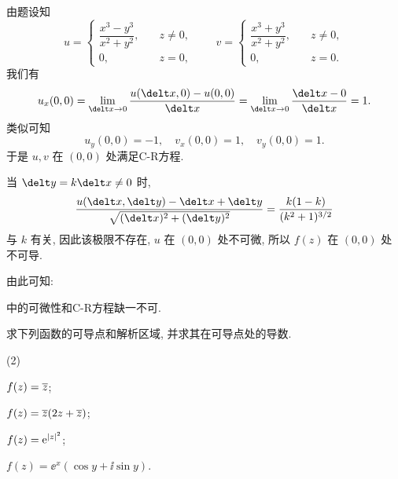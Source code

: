 \begin{solution}
  由题设知
  \[
    u=\begin{cases}
        \dfrac{x^3-y^3}{x^2+y^2},\quad &z\neq 0,\\
        0,&z=0,
      \end{cases}\qquad
    v=\begin{cases}
        \dfrac{x^3+y^3}{x^2+y^2},\quad &z\neq 0,\\
        0,&z=0.
      \end{cases}
  \]
  我们有
  \[
     u_x(0,0)
    =\lim_{\delt x\ra 0}\frac{u(\delt x,0)-u(0,0)}{\delt x}
    =\lim_{\delt x\ra 0}\frac{\delt x-0}{\delt x}=1.
  \]
  类似可知
  \[
    u_y(0,0)=-1,\quad
    v_x(0,0)=1,\quad
    v_y(0,0)=1.
  \]
  于是 $u,v$ 在 $(0,0)$ 处满足C-R方程.

  当 $\delt y=k\delt x\neq 0$ 时,
  \[
     \frac{u(\delt x,\delt y)-\delt x+\delt y}{\sqrt{(\delt x)^2+(\delt y)^2}}
    =\frac{k(1-k)}{(k^2+1)^{3/2}}
  \]
  与 $k$ 有关, 因此该极限不存在, $u$ 在 $(0,0)$ 处不可微, 所以 $f(z)$ 在 $(0,0)$ 处不可导.
\end{solution}

由此可知:
\begin{marker}
  \thmCR 中的可微性和C-R方程缺一不可.
\end{marker}

\begin{example}
  求下列函数的可导点和解析区域, 并求其在可导点处的导数.
  \begin{subexample}(2)
    \item $f(z)=\overline z$;
    \item $f(z)=\overline z(2z+\overline z)$;
    \item $f(z)=\mathrm{e}^{\lvert z\rvert^2}$;
    \item $f(z)=\ee^x(\cos y+\ii\sin y)$.
    \label{enum:exp}
  \end{subexample}
\end{example}

